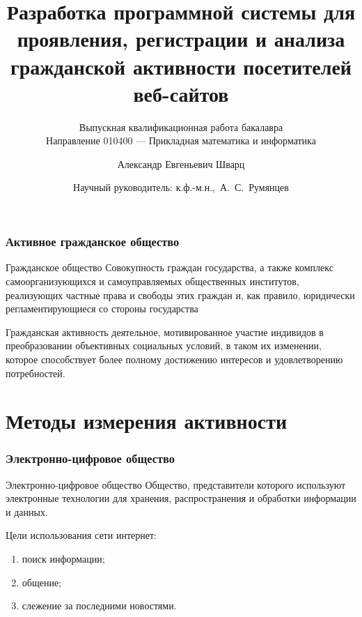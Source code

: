 \documentclass{beamer}
\title[%
    Веб-сервис измерения активности аудитории сетевых СМИ
]{%
    Разработка программной системы для проявления, регистрации и анализа гражданской активности посетителей веб-сайтов
}
\subtitle{Выпускная квалификационная работа бакалавра\\
Направление 010400 --- Прикладная математика и информатика}
\author[%
    Александр Шварц
]{%
    Александр Евгеньевич Шварц
}
\date[%
    22.04.2015
]{%
    Научный руководитель: к.ф.-м.н.,~А.~С.~Румянцев
}
\institute[%
    ПетрГУ
]{%
    Петрозаводский государственный университет\\
	Математический факультет\\
    Кафедра прикладной математики и кибернетики
}
\begin{document}
\begin{frame}
  \titlepage
\end{frame}


\begin{frame}
\frametitle{Активное гражданское общество}
\begin{block}{Гражданское общество}
Совокупность граждан государства, а также комплекс самоорганизующихся и самоуправляемых общественных институтов, реализующих частные права и свободы этих граждан и, как правило, юридически регламентирующиеся со стороны государства
\end{block}

\begin{block}{Гражданская активность}
деятельное, мотивированное участие индивидов в преобразовании объективных социальных условий, в таком их изменении, которое способствует более полному достижению интересов и удовлетворению потребностей.
\end{block}
\end{frame}

\section{Методы измерения активности}
\begin{frame}
\frametitle{Электронно-цифровое общество}

\begin{block}{Электронно-цифровое общество}
Общество, представители которого используют электронные технологии для хранения, распространения и обработки информации и данных. 
\end{block}

Цели использования сети интернет:
\begin{enumerate}
  \item поиск информации;
  \item общение;
  \item слежение за последними новостями.
\end{enumerate}

\end{frame}
\end{document}
